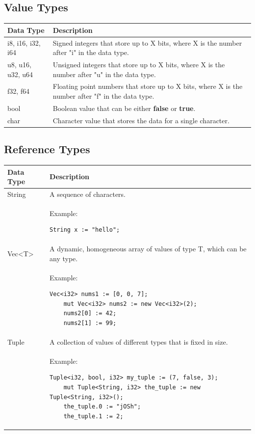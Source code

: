 \documentclass[letterpaper, 10pt, DIV=13]{scrartcl}
\numberwithin{equation}{section}
\numberwithin{figure}{section}
\numberwithin{table}{section}
\begin{document}
\subsection{Value Types}
\begin{center}
\begin{longtable}{|p{3in}|p{3in}|}
    \hline
    \textbf{Data Type} & \textbf{Description} \\
    \hline
    i8, i16, i32, i64 & Signed integers that store up to X bits, where X is the
                        number after "i" in the data type. \\
    \hline
    u8, u16, u32, u64 & Unsigned integers that store up to X bits, where X is the
                        number after "u" in the data type. \\
    \hline
    f32, f64 & Floating point numbers that store up to X bits, where X is the
               number after "f" in the data type. \\
    \hline
    bool & Boolean value that can be either \textbf{false} or \textbf{true}. \\
    \hline
    char & Character value that stores the data for a single character. \\
    \hline
\end{longtable}
\end{center}

\subsection{Reference Types}
\begin{center}
\begin{longtable}{|p{3in}|p{3in}|}
    \hline
    \textbf{Data Type} & \textbf{Description} \\
    \hline
    String & A sequence of characters. \\
    & Example: \begin{lstlisting}[nolol, numbers = none]
    String x := "hello";
    \end{lstlisting} \\
    \hline
    Vec<T> & A dynamic, homogeneous array of values of type T, which can be any type. \\
    & Example: \begin{lstlisting}[nolol, numbers = none]
    Vec<i32> nums1 := [0, 0, 7];
    mut Vec<i32> nums2 := new Vec<i32>(2);
    nums2[0] := 42;
    nums2[1] := 99;
    \end{lstlisting} \\
    \hline
    Tuple & A collection of values of different types that is fixed in size. \\
    & Example: \begin{lstlisting}[nolol, numbers = none]
    Tuple<i32, bool, i32> my_tuple := (7, false, 3);
    mut Tuple<String, i32> the_tuple := new Tuple<String, i32>();
    the_tuple.0 := "jOSh";
    the_tuple.1 := 2;
    \end{lstlisting} \\
    \hline
\end{longtable}
\end{center}
\end{document}
